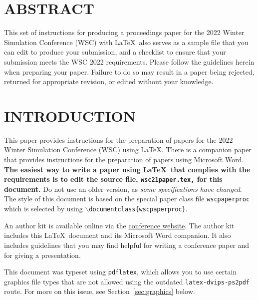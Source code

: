 \documentclass{article}
\begin{document}
\section*{ABSTRACT}
This set of instructions for producing a proceedings paper for the 2022 Winter Simulation Conference (WSC) with \LaTeX\ also serves as a sample file that you can edit to produce your submission, and a checklist to ensure that your submission meets the WSC 2022 requirements. Please follow the guidelines herein when preparing your paper. Failure to do so may result in a paper being rejected, returned for appropriate revision, or edited without your knowledge.

\section{INTRODUCTION}
\label{sec:intro}

This paper provides instructions for the preparation of papers for the 2022
Winter Simulation Conference (WSC) using \LaTeX. There is a companion paper that
provides instructions for the preparation of papers using Microsoft Word. \textbf{The easiest way to write a paper using \LaTeX\ that complies with the
requirements is to edit the source file, {\tt wsc21paper.tex,} for this document.} 
Do not use an older version, as \textit{some specifications have changed}.
The style of this document is based on the special paper class file {\tt wscpaperproc} which is selected by using {\tt $\backslash$documentclass\{wscpaperproc\}}.

An author kit is available online via the \href{http://www.wintersim.org}%
{conference website}.
The author kit includes this \LaTeX\ document and its Microsoft Word companion.
It also includes guidelines that you may find helpful for writing a conference paper and for giving a presentation.

This document was typeset using {\tt pdflatex}, which allows you to use certain
graphics file types that are not allowed using the outdated {\tt latex-dvips-ps2pdf} route.
For more on this issue, see Section~\ref{sec:graphics} below.
\end{document}

